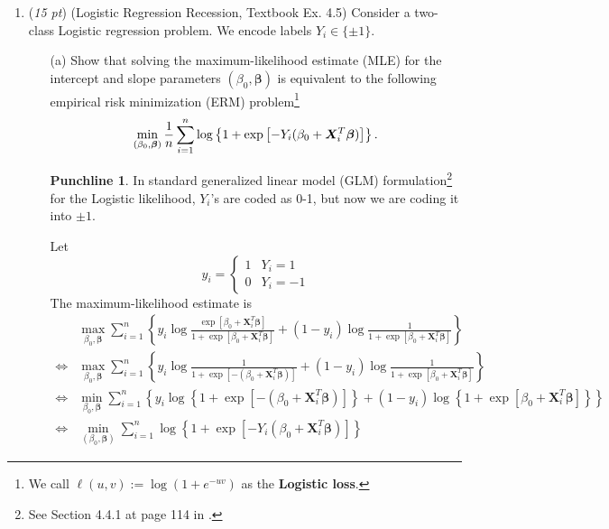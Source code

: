 \documentclass[10pt]{article}
\theoremstyle{definition}
\newtheorem*{pchln}{Punchline}
\theoremstyle{remark}
\newcommand{\bX}{\bm{X}}
\newcommand{\bbeta}{\bm{\beta}}
\begin{document}
\begin{enumerate}
	\item (\textit{15 pt}) (Logistic Regression Recession, Textbook Ex. 4.5) Consider a two-class Logistic regression problem. We encode labels $ Y_{i} \in \{ \pm 1 \} $.
	\begin{itemize}
		\item [(a)] Show that solving the maximum-likelihood estimate (MLE) for the intercept and slope parameters $ (\beta_{0},\bbeta) $ is equivalent to the following empirical risk minimization (ERM) problem\footnote{We call $ \ell(u,v) := \log(1+e^{-uv}) $ as the \textbf{Logistic loss}.}
		\[ \min_{(\beta_{0},\bbeta)}{1 \over n}\sum_{i=1}^{n} \log\left\{ 1 + \exp\left[ -Y_{i}(\beta_{0}+\bX_{i}^{T}\bbeta) \right]  \right\}. \]
		\begin{pchln}
			In standard generalized linear model (GLM) formulation\footnote{See Section 4.4.1 at page 114 in \cite[McCullagh and Nelder (1989)]{mccullagh1989generalized}.} for the Logistic likelihood, $ Y_{i} $'s are coded as 0-1, but now we are coding it into $ \pm 1 $.
		\end{pchln}
		
		Let 
		\[y_i=\begin{cases}1 & Y_i=1 \\ 0 & Y_i=-1\end{cases}\]
		The maximum-likelihood estimate is
		\begin{align*}
		    & \max_{\beta_{0},\bbeta} \sum_{i=1}^n \left\{ y_i \log \frac{\exp\left[ \beta_{0}+\bX_{i}^{T}\bbeta \right]}{1+\exp\left[ \beta_{0}+\bX_{i}^{T}\bbeta \right]} + (1-y_i) \log \frac{1}{1+\exp\left[ \beta_{0}+\bX_{i}^{T}\bbeta \right]} \right\} \\
		    \iff & \max_{\beta_{0},\bbeta} \sum_{i=1}^n \left\{ y_i \log \frac{1}{1+\exp\left[-( \beta_{0}+\bX_{i}^{T}\bbeta) \right]} + (1-y_i) \log \frac{1}{1+\exp\left[ \beta_{0}+\bX_{i}^{T}\bbeta \right]} \right\} \\
		    \iff & \min_{\beta_{0},\bbeta} \sum_{i=1}^n \left\{ y_i \log \left\{1+\exp\left[-( \beta_{0}+\bX_{i}^{T}\bbeta) \right]\right\} + (1-y_i) \log \left\{1+\exp\left[ \beta_{0}+\bX_{i}^{T}\bbeta \right]\right\} \right\} \\
		    \iff & \min_{(\beta_{0},\bbeta)}\sum_{i=1}^{n} \log\left\{ 1 + \exp\left[ -Y_{i}(\beta_{0}+\bX_{i}^{T}\bbeta) \right]  \right\}
		\end{align*}
		

\end{itemize}
\end{enumerate}
\end{document}
